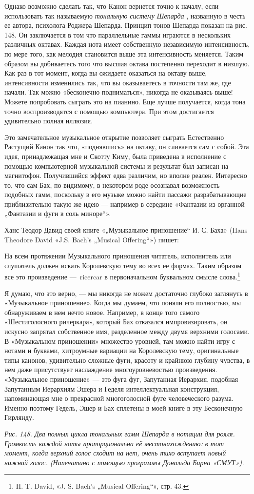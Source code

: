 \documentclass[../main.tex]{subfiles}
\begin{document}
Однако возможно сделать так, что Канон вернется точно к началу, если использовать так называемую \emph{тональную систему Шепарда} , названную в честь ее автора, психолога Роджера Шепарда. Принцип тонов Шепарда показан на рис. 148. Он заключается в том что параллельные гаммы играются в нескольких различных октавах. Каждая нота имеет собственную независимую интенсивность, по мере того, как мелодия становится выше эта интенсивность меняется. Таким образом вы добиваетесь того что высшая октава постепенно переходит в низшую. Как раз в тот момент, когда вы ожидаете оказаться на октаву выше, интенсивности изменились так, что вы оказываетесь в точности там же, где начали. Так можно «бесконечно подниматься», никогда не оказываясь выше! Можете попробовать сыграть это на пианино. Еще лучше получается, когда тона точно воспроизводятся с помощью компьютера. При этом достигается удивительно полная иллюзия.

Это замечательное музыкальное открытие позволяет сыграть Естественно Растущий Канон так что, «поднявшись» на октаву, он сливается сам с собой. Эта идея, принадлежащая мне и Скотту Киму, была приведена в исполнение с помощью компьютерной музыкальной системы и результат был записан на магнитофон. Получившийся эффект едва различим, но вполне реален. Интересно то, что сам Бах, по-видимому, в некотором роде осознавал возможность подобных гамм, поскольку в его музыке можно найти пассажи разрабатывающие приблизительно такую же идею --- например в середине «Фантазии из органной „Фантазии и фуги в соль миноре``».

Ханс Теодор Давид своей книге «„Музыкальное приношение`` И. С. Баха» (Hans Theodore David «J.S. Bach's „Musical Offering``») пишет:

На всем протяжении Музыкального приношения читатель, исполнитель или слушатель должен искать Королевскую тему во всех ее формах. Таким образом все это произведение ---~ricercar в первоначальном буквальном смысле слова.\footnote{H. T. David, «J. S. Bach's „Musical Offering``», стр. 43.}

Я думаю, что это верно, --- мы никогда не можем достаточно глубоко заглянуть в «Музыкальное приношение». Когда мы думаем, что поняли его полностью, мы обнаруживаем в нем нечто новое. Например, в конце того самого «Шестиголосного ричеркара», который Бах отказался импровизировать, он искусно запрятал собственное имя, разделенное между двумя верхними голосами. В «Музыкальном приношении» множество уровней, там можно найти игру с нотами и буквами, хитроумные вариации на Королевскую тему, оригинальные типы канонов, удивительно сложные фуги, красоту и крайнюю глубину чувства, в нем даже присутствует наслаждение многоуровневостью произведения. «Музыкальное приношение» --- это фуга фуг, Запутанная Иерархия, подобная Запутанным Иерархиям Эшера и Геделя интеллектуальная конструкция, напоминающая мне о прекрасной многоголосной фуге человеческого разума. Именно поэтому Гедель, Эшер и Бах сплетены в моей книге в эту Бесконечную Гирлянду.

\emph{Рис. 148. Два полных цикла тональных гамм Шепарда в нотации для рояля. Громкость каждой ноты пропорциональна её местонахождению: в тот момент, когда верхний голос сходит на нет, очень тихо вступает новый нижний голос. (Напечатано с помощью программы Дональда Бирна «СМУТ»).}
\end{document}
